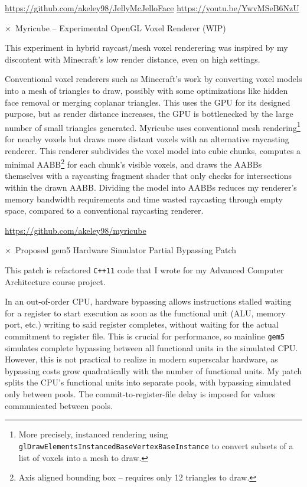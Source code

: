\documentclass[11pt]{article}
\newcommand{\web}[1]{{ \color{webColor} \small \url{#1}}}
\newcommand{\mySub}[1]{{\color{subColor}\hspace{-6mm} \( \times \)\ \textsf{#1}}}
\begin{document}
\web{https://github.com/akeley98/JellyMcJelloFace}
\hfill\web{https://youtu.be/YwvMSeB6NzU}

\mySub{Myricube -- Experimental OpenGL Voxel Renderer (WIP)}

This experiment in hybrid raycast/mesh voxel renderering was inspired
by my discontent with Minecraft's low render distance, even on high
settings.

Conventional voxel renderers such as Minecraft's work by converting
voxel models into a mesh of triangles to draw, possibly with some
optimizations like hidden face removal or merging coplanar
triangles. This uses the GPU for its designed purpose, but as render
distance increases, the GPU is bottlenecked by the large number of
small triangles generated. Myricube uses conventional mesh
rendering\footnote{More precisely, instanced rendering using
  \texttt{glDrawElementsInstancedBaseVertexBaseInstance} to convert
  subsets of a list of voxels into a mesh to draw.} for nearby voxels
but draws more distant voxels with an alternative raycasting
renderer. This renderer subdivides the voxel model into cubic chunks,
computes a minimal AABB\footnote{Axis aligned bounding box -- requires
  only 12 triangles to draw.} for each chunk's visible voxels, and
draws the AABBs themselves with a raycasting fragment shader that only
checks for intersections within the drawn AABB.  Dividing the model
into AABBs reduces my renderer's memory bandwidth requirements and
time wasted raycasting through empty space, compared to a conventional
raycasting renderer.

\web{https://github.com/akeley98/myricube}

\mySub{Proposed gem5 Hardware Simulator Partial Bypassing Patch}

This patch is refactored \texttt{C++11} code that I wrote for my
Advanced Computer Architecture course project.

In an out-of-order CPU, hardware bypassing allows instructions stalled
waiting for a register to start execution as soon as the functional
unit (ALU, memory port, etc.) writing to said register completes,
without waiting for the actual commitment to register file. This is
crucial for performance, so mainline \texttt{gem5} simulates complete
bypassing between all functional units in the simulated CPU. However,
this is not practical to realize in modern superscalar hardware, as
bypassing costs grow quadratically with the number of functional
units. My patch splits the CPU's functional units into separate pools,
with bypassing simulated only between pools. The
commit-to-register-file delay is imposed for values communicated
between pools.
\end{document}
